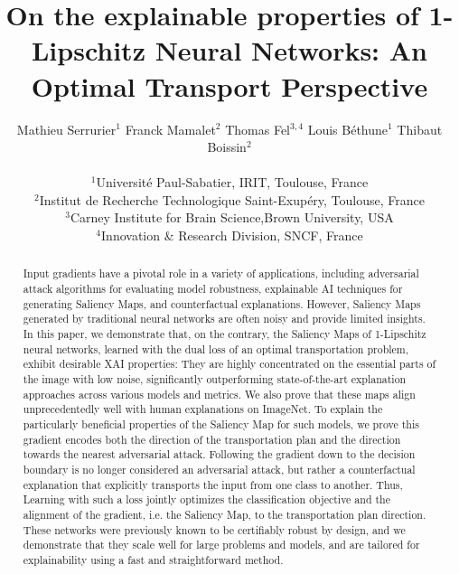 \documentclass{article}
\title{On the explainable properties of 1-Lipschitz Neural Networks: An Optimal Transport Perspective}
\author{
Mathieu Serrurier$^1$ \And Franck Mamalet$^2$ \And Thomas Fel$^{3,4}$ \And Louis Béthune$^1$ \And Thibaut Boissin$^2$\\
\\
$^1$Université Paul-Sabatier, IRIT, Toulouse, France\\
$^2$Institut de Recherche Technologique Saint-Exupéry, Toulouse, France\\
$^3$Carney Institute for Brain Science,Brown University, USA \\
$^4$Innovation \& Research Division, SNCF, France
}
\newcommand{\commentgreen}[1]{
    \textcolor{green}{ #1 }
}
\begin{document}
\maketitle


\begin{abstract}



Input gradients have a pivotal role in a variety of applications, including adversarial attack algorithms for evaluating model robustness, explainable AI techniques for generating Saliency Maps, and counterfactual explanations.
However, Saliency Maps generated by traditional neural networks are often noisy and provide limited insights. 
In this paper, we demonstrate that, on the contrary, the Saliency Maps of 1-Lipschitz neural networks, learned with the dual loss of an optimal transportation problem, exhibit desirable XAI properties:
They are highly concentrated on the essential parts of the image with low noise, significantly outperforming state-of-the-art explanation approaches across various models and metrics. 
We also prove that these maps align unprecedentedly well with human explanations on ImageNet.
To explain the particularly beneficial properties of the Saliency Map for such models, we prove this gradient encodes both the direction of the transportation plan and the direction towards the nearest adversarial attack. Following the gradient down to the decision boundary is no longer considered an adversarial attack, but rather a counterfactual explanation that explicitly transports the input from one class to another. 
Thus, Learning with such a loss jointly optimizes the classification objective and the alignment of the gradient, i.e. the Saliency Map, to the transportation plan direction.
These networks were previously known to be certifiably robust by design, and we demonstrate that they scale well for large problems and models, and are tailored for explainability using a fast and straightforward method.



\end{abstract}
\end{document}
